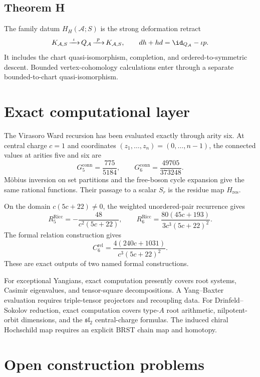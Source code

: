 \documentclass[11pt]{article}
\theoremstyle{plain}
\theoremstyle{definition}
\theoremstyle{remark}
\newcommand{\cA}{\mathcal{A}}
\begin{document}
\subsection*{Theorem H}

The family datum \(H_H(\cA;S)\) is the strong deformation retract
\[
 K_{\cA,S}
 \mathop{\xrightarrow{\ \iota\ }}Q_\cA
 \mathop{\xrightarrow{\ p\ }}K_{\cA,S},
 \qquad
 dh+hd=\id_{Q_\cA}-\iota p.
\]
It includes the chart quasi-isomorphism, completion, and
ordered-to-symmetric descent.  Bounded vertex-cohomology calculations
enter through a separate bounded-to-chart quasi-isomorphism.

\section{Exact computational layer}
\label{sec:standalone-exact-computation}

The Virasoro Ward recursion has been evaluated exactly through arity
six.  At central charge \(c=1\) and coordinates
\((z_1,\ldots,z_n)=(0,\ldots,n-1)\), the connected values at arities
five and six are
\[
 G^{\mathrm{conn}}_5=\frac{775}{5184},
 \qquad
 G^{\mathrm{conn}}_6=\frac{49705}{373248}.
\]
Möbius inversion on set partitions and the free-boson cycle expansion
give the same rational functions.  Their passage to a scalar
\(S_r\) is the residue map \(H_{\mathrm{res}}\).

On the domain \(c(5c+22)\ne0\), the weighted unordered-pair recurrence
gives
\[
 R_5^{\mathrm{Ricc}}
 =-\frac{48}{c^2(5c+22)},\qquad
 R_6^{\mathrm{Ricc}}
 =\frac{80(45c+193)}{3c^3(5c+22)^2}.
\]
The formal relation construction gives
\[
 C_6^{\mathrm{rel}}
 =\frac{4(240c+1031)}{c^3(5c+22)^2}.
\]
These are exact outputs of two named formal constructions.

For exceptional Yangians, exact computation presently covers root
systems, Casimir eigenvalues, and tensor-square decompositions.
A Yang--Baxter evaluation requires triple-tensor projectors and
recoupling data.  For Drinfeld--Sokolov reduction, exact computation
covers type-\(A\) root arithmetic, nilpotent-orbit dimensions, and
the \(\mathfrak{sl}_2\) central-charge formulas.  The induced
chiral Hochschild map requires an explicit BRST chain map and
homotopy.

\section{Open construction problems}
\label{sec:standalone-open-obligations}
\end{document}
